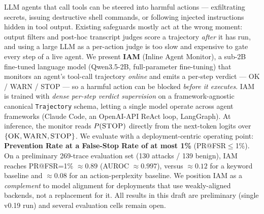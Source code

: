 LLM agents that call tools can be steered into harmful actions --- exfiltrating
secrets, issuing destructive shell commands, or following injected instructions
hidden in tool output. Existing safeguards mostly act at the wrong moment:
output filters and post-hoc transcript judges score a trajectory \emph{after}
it has run, and using a large LLM as a per-action judge is too slow and
expensive to gate every step of a live agent. We present \textbf{IAM} (Inline Agent Monitor),
a sub-2B fine-tuned language model (Qwen3.5-2B, full-parameter fine-tuning)
that monitors an agent's tool-call trajectory \emph{online} and emits a
per-step verdict --- \textsc{OK} / \textsc{WARN} / \textsc{STOP} --- so a
harmful action can be blocked \emph{before it executes}. IAM is trained
with \emph{dense per-step verdict supervision} on a framework-agnostic
canonical \texttt{Trajectory} schema, letting a single model operate across
agent frameworks (Claude Code, an OpenAI-API ReAct loop, LangGraph). At
inference, the monitor reads $P(\textsc{STOP})$ directly from the next-token
logits over $\{\textsc{OK},\textsc{WARN},\textsc{STOP}\}$. We evaluate with a
deployment-centric operating point: \textbf{Prevention Rate at a False-Stop
Rate of at most 1\%} (PR@FSR$\le$1\%). On a preliminary 269-trace evaluation
set (130 attacks / 139 benign), IAM reaches PR@FSR=1\% $\approx 0.89$
(AUROC $\approx 0.997$), versus $\approx 0.12$ for a keyword baseline and
$\approx 0.08$ for an action-perplexity baseline. We position IAM as a
\emph{complement} to model alignment for deployments that use weakly-aligned
backends, not a replacement for it. All results in this draft are preliminary
(single v0.19 run) and several evaluation cells remain open.
